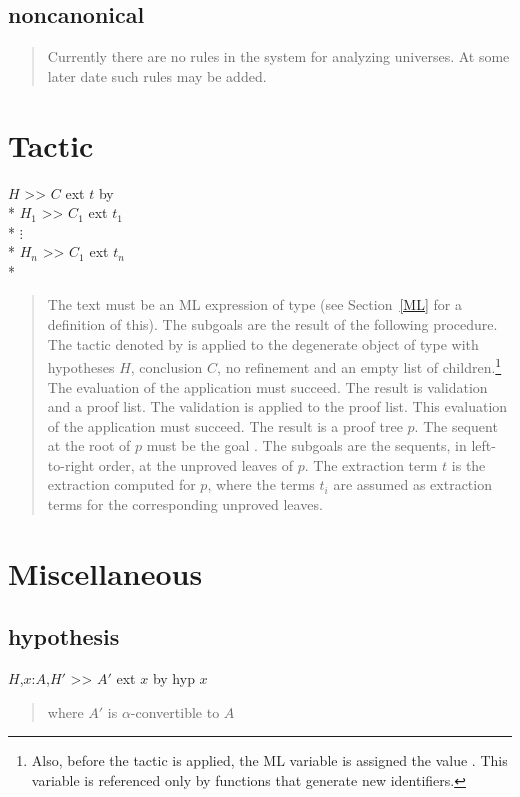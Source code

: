\subsection*{noncanonical}
\begin{quote}\rm
Currently there are no rules in the system for analyzing universes.
At some later date such rules may be added.
\end{quote}

\section{Tactic}
\label{tactic-rule}
\goal $H$ >> $C$ ext $t$ by  \\*
\subgoal $H_1$ >> $C_1$ ext $t_1$ \\*
\subgoal $\vdots$ \\*
\subgoal $H_n$ >> $C_1$ ext $t_n$ \\*
\begin{quote}\rm
The text  must be an ML expression of type 
(see Section~\ref{ML} for a definition of this).
The subgoals are the result of the following procedure.  The tactic
denoted by  is applied to the degenerate object of type
 with hypotheses $H$, conclusion $C$, no refinement and an empty
list of children.\footnote{Also, before the tactic is applied, 
the ML variable
 is assigned the value .  This
variable is referenced only by functions that generate new identifiers.}
The evaluation of the application must succeed.  The
result is validation and a proof list.  The validation is applied to the
proof list.  This evaluation of the application must succeed.  The result
is a proof tree $p$.  The sequent at the root of $p$ must be the
goal .  The subgoals  are the sequents, in
left-to-right order, at the unproved leaves of $p$.  The
extraction term $t$ is the extraction computed for $p$, where the terms 
$t_i$ are assumed as extraction terms for the corresponding unproved
leaves.
\end{quote}

\section{Miscellaneous}
\subsection*{hypothesis}
\goal $H$,$x$:$A$,$H'$ >> $A'$ ext $x$ by hyp $x$
\begin{quote}\rm
where $A'$ is $\alpha$-convertible to $A$
\end{quote}

